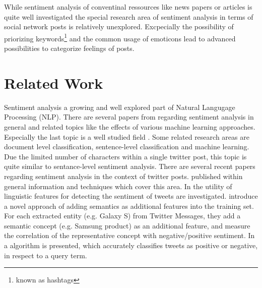 While sentiment analysis of conventinal ressources like news papers or articles is quite well investigated the special research area of sentiment analysis in terms of social network posts is relatively unexplored. Excpecially the possibility of priorizing keywords\footnote{known as hashtags} and the common usage of emoticons lead to advanced possibilities to categorize feelings of posts.


\section{Related Work}
Sentiment analysis a growing and well explored part of Natural Langugage Processing (NLP). There are several papers from \citeauthor{Pang2008} regarding sentiment analysis in general and related topics like the effects of various machine learning approaches\autocite{Pang2002}\autocite{Pang2008}. Especially the last topic is a well studied field \autocite{Manning2000}.
Some related research areas are document level classification, sentence-level classification and machine learning. Due the limited number of characters within a single twitter post, this topic is quite similar to sentance-level sentiment analysis.
There are several recent papers regarding sentiment analysis in the context of twitter posts. \citeauthor{Agarwal2011} published within  general information and techniques which cover this area\autocite{Agarwal2011}. In  the utility of linguistic features for detecting the sentiment of tweets are investigated. 
\citeauthor{Saif2012} introduce a novel approach of adding semantics as additional features into the training set. For each extracted entity (e.g. Galaxy S) from Twitter Messages, they add a semantic concept (e.g. Samsung product) as an additional feature, and measure the correlation of the representative concept with negative/positive sentiment\autocite{Saif2012}. In  a algorithm is presented, which accurately classifies tweets as positive or negative, in respect to a query term\autocite{Go2009}.